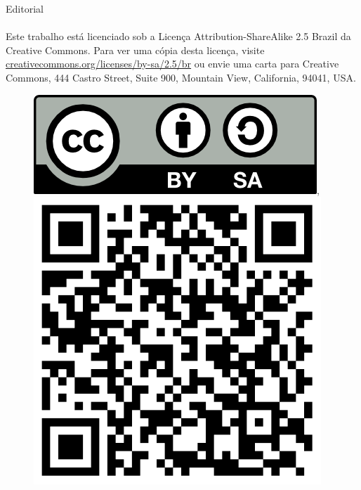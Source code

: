 \begin{editorial}{Editorial}
\paragraph{}
Este trabalho está licenciado sob a Licença Attribution-ShareAlike 2.5 Brazil
da Creative Commons. Para ver uma cópia desta licença,
visite \url{creativecommons.org/licenses/by-sa/2.5/br} ou envie uma
carta para Creative Commons, 444 Castro Street, Suite 900, Mountain View,
California, 94041, USA.
\\
\begin{figure}[H]
    \centering
    \includegraphics{img/cc/by-sa.png},
    \includegraphics[scale=0.2]{img/qrcode.pdf} %
\end{figure}

\thispagestyle{empty}
\pagebreak
\end{editorial}


